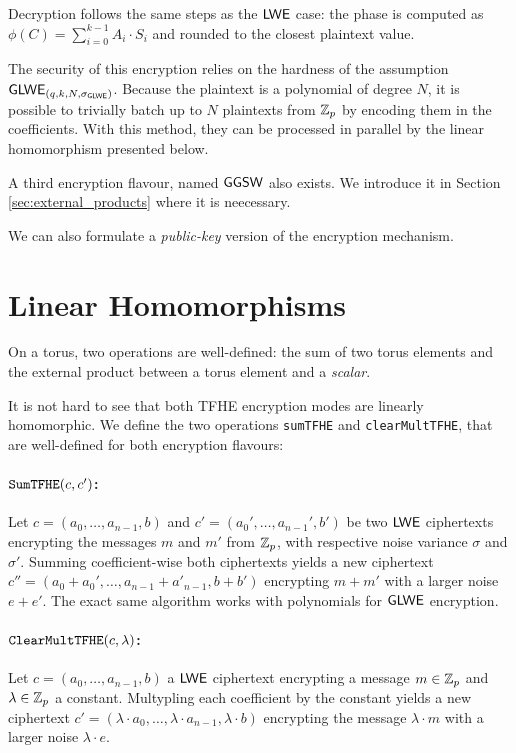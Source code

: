 Decryption follows the same steps as the $\textsf{LWE}$ case: the phase is computed as $\phi(C) = \sum_{i=0}^{k-1} A_i \cdot S_i$ and rounded to the closest plaintext value.


The security of this encryption relies on the hardness of the assumption $\textsf{GLWE}_{(q, k, N, \sigma_{\textsf{GLWE}})}$. Because the plaintext is a polynomial of degree $N$, it is possible to trivially batch up to $N$ plaintexts from $\mathbb{Z}_p$ by encoding them in the coefficients. With this method, they can be processed in parallel by the linear homomorphism presented below.
\medskip

A third encryption flavour, named $\textsf{GGSW}$ also exists. We introduce it in Section \ref{sec:external_products} where it is neecessary.


We can also formulate a \textit{public-key} version of the encryption mechanism. 



\section{Linear Homomorphisms}

On a torus, two operations are well-defined: the sum of two torus elements and the external product between a torus element and a \textit{scalar}.

It is not hard to see that both TFHE encryption modes are linearly homomorphic. We define the two operations \texttt{sumTFHE} and \texttt{clearMultTFHE}, that are well-defined for both encryption flavours:


\paragraph{$\texttt{SumTFHE}(c, c')$:} Let $c = (a_0, \dots, a_{n-1}, b)$ and $c' = (a_0', \dots, a_{n-1}', b')$ be two $\textsf{LWE}$ ciphertexts encrypting the messages $m$ and $m'$ from $\mathbb{Z}_p$, with respective noise variance $\sigma$ and $\sigma'$. Summing coefficient-wise both ciphertexts yields a new ciphertext $c'' = (a_0 + a_0', \dots, a_{n-1} + a'_{n-1}, b + b')$ encrypting $m + m'$ with a larger noise $e + e'$. The exact same algorithm works with polynomials for $\textsf{GLWE}$ encryption. 


\paragraph{$\texttt{ClearMultTFHE}(c, \lambda)$:} Let $c = (a_0, \dots, a_{n-1}, b)$ a $\textsf{LWE}$ ciphertext encrypting a message $m \in \mathbb{Z}_p$ and $\lambda \in \mathbb{Z}_p$ a constant. Multypling each coefficient by the constant yields a new ciphertext $c' = (\lambda \cdot a_0, \dots, \lambda \cdot a_{n-1}, \lambda \cdot b)$ encrypting the message $\lambda \cdot m$ with a larger noise $\lambda \cdot e$.

